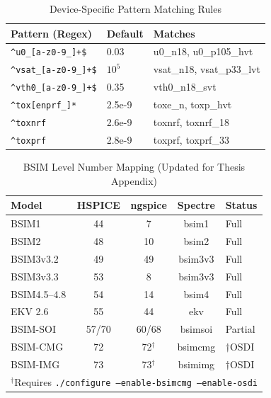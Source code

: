 \documentclass[10pt,twocolumn]{article}
\begin{document}
\begin{table}[!t]
\caption{Device-Specific Pattern Matching Rules}
\label{tab:device_patterns_appendix}
\centering
\renewcommand{\arraystretch}{1.15}
\begin{tabular}{@{}lll@{}}
\toprule
\textbf{Pattern (Regex)} & \textbf{Default} & \textbf{Matches} \\
\midrule
\texttt{\^{}u0\_[a-z0-9\_]+\$} & 0.03 & u0\_n18, u0\_p105\_hvt \\
\texttt{\^{}vsat\_[a-z0-9\_]+\$} & $10^5$ & vsat\_n18, vsat\_p33\_lvt \\
\texttt{\^{}vth0\_[a-z0-9\_]+\$} & 0.35 & vth0\_n18\_svt \\
\texttt{\^{}tox[enprf\_]*} & 2.5e-9 & toxe\_n, toxp\_hvt \\
\texttt{\^{}toxnrf} & 2.6e-9 & toxnrf, toxnrf\_18 \\
\texttt{\^{}toxprf} & 2.8e-9 & toxprf, toxprf\_33 \\
\bottomrule
\end{tabular}
\end{table}

\begin{table}[!t]
\caption{BSIM Level Number Mapping (Updated for Thesis Appendix)}
\label{tab:bsim_levels_appendix}
\centering
\renewcommand{\arraystretch}{1.15}
\begin{tabular}{@{}lcccl@{}}
\toprule
\textbf{Model} & \textbf{HSPICE} & \textbf{ngspice} & \textbf{Spectre} & \textbf{Status} \\
\midrule
BSIM1 & 44 & 7 & bsim1 & Full \\
BSIM2 & 48 & 10 & bsim2 & Full \\
BSIM3v3.2 & 49 & 49 & bsim3v3 & Full \\
BSIM3v3.3 & 53 & 8 & bsim3v3 & Full \\
BSIM4.5--4.8 & 54 & 14 & bsim4 & Full \\
EKV 2.6 & 55 & 44 & ekv & Full \\
BSIM-SOI & 57/70 & 60/68 & bsimsoi & Partial \\
BSIM-CMG & 72 & 72$^\dagger$ & bsimcmg & $\dagger$OSDI \\
BSIM-IMG & 73 & 73$^\dagger$ & bsimimg & $\dagger$OSDI \\
\bottomrule
\multicolumn{5}{l}{\footnotesize $^\dagger$Requires \texttt{./configure --enable-bsimcmg --enable-osdi}}
\end{tabular}
\end{table}
\end{document}
